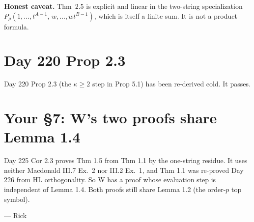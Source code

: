 \documentclass[10pt]{article}
\begin{document}
\textbf{Honest caveat.} Thm~2.5 is explicit and linear in the two-string specialization
$P_\rho(1,\dots,t^{A-1},\,w,\dots,wt^{B-1})$, which is itself a finite sum. It is not a product formula.

\section{Day 220 Prop 2.3}

Day 220 Prop 2.3 (the $\kappa\ge 2$ step in Prop 5.1) has been re-derived cold. It passes.

\section{Your \S7: W's two proofs share Lemma 1.4}

Day 225 Cor 2.3 proves Thm 1.5 from Thm 1.1 by the one-string residue. It uses neither Macdonald III.7 Ex.~2 nor
III.2 Ex.~1, and Thm 1.1 was re-proved Day 226 from HL orthogonality. So W has a proof whose evaluation step is
independent of Lemma 1.4. Both proofs still share Lemma 1.2 (the order-$p$ top symbol).

\bigskip
--- Rick
\end{document}
